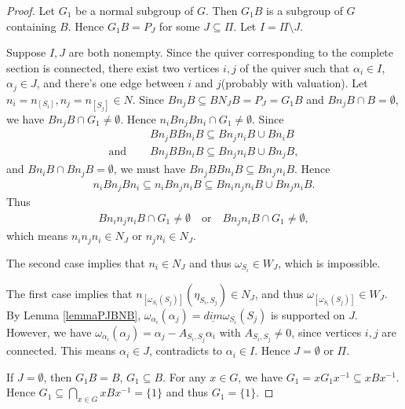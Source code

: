 \documentclass[12pt]{amsart}
\begin{document}
\begin{proof}
    Let $G_1$ be a normal subgroup of $G$.
    Then $G_1B$ is a subgroup of $G$ containing $B$.
    Hence $G_1B = P_J$ for some $J\subseteq  \Pi$.
    Let $I=\Pi\setminus J$. 

    Suppose $I,J$ are both nonempty.
    Since the quiver corresponding to the complete section is connected, there exist two vertices $i,j$ of the quiver such that $\alpha_i \in I$, $\alpha_j \in J$, and there's one edge between $i$ and $j$(probably with valuation).
    Let $n_i=n_{[S_i]},n_j=n_{[S_j]}\in N$.
    Since $Bn_jB\subseteq  BN_JB=P_J=G_1B$ and $Bn_jB\cap B = \emptyset$, we have $Bn_jB\cap G_1 \neq \emptyset$.
    Hence $n_iBn_jBn_i\cap G_1 \neq \emptyset$.
    Since 
    \begin{align*}
        &Bn_jBBn_iB \subseteq  Bn_jn_iB \cup Bn_iB \\
        \text{and }\quad &Bn_jBBn_iB \subseteq  Bn_jn_iB \cup Bn_jB ,
    \end{align*}
    and $Bn_iB\cap Bn_jB = \emptyset$, we must have $Bn_jBBn_iB \subseteq  Bn_jn_iB $.
    Hence
    \begin{align*}
        n_iBn_jBn_i \subseteq  n_iBn_jn_iB \subseteq  Bn_in_jn_iB \cup Bn_jn_iB.
    \end{align*}
    Thus 
    \begin{align*}
        Bn_in_jn_iB \cap G_1 \neq \emptyset \quad \text{or} \quad Bn_jn_iB \cap G_1 \neq \emptyset,
    \end{align*}
    which means $n_in_jn_i\in N_J$ or $n_jn_i\in N_J$.

    The second case implies that $n_i\in N_J$ and thus $\omega_{S_i}\in W_J$, which is impossible.

    The first case implies that $n_{[\omega_{S_i}(S_j)]}(\eta_{S_i,S_j})\in N_J$, and thus $\omega_{[\omega_{S_i}(S_j)]} \in W_J$.
    By Lemma \ref{lemmaPJBNB}, $\omega_{\alpha_i}(\alpha_j) = \underline{dim}\omega_{S_i}(S_j)$ is supported on $J$.
    However, we have $\omega_{\alpha_i}(\alpha_j) = \alpha_j - A_{S_i,S_j}\alpha_i$ with $A_{S_i,S_j}\neq 0$, since vertices $i,j$ are connected.
    This means $\alpha_i \in J$, contradicts to $\alpha_i \in I$. 
    Hence $J = \emptyset$ or $\Pi$.


    If $J = \emptyset$, then $G_1B=B$, $G_1\subseteq  B$.
    For any $ x\in G$, we have $G_1=xG_1x^{-1}\subseteq  xBx^{-1}$.
    Hence $G_1\subseteq  \bigcap\limits_{x\in G} xBx^{-1} = \{1\}$ and thus $G_1=\{1\}$.


\end{proof}
\end{document}
